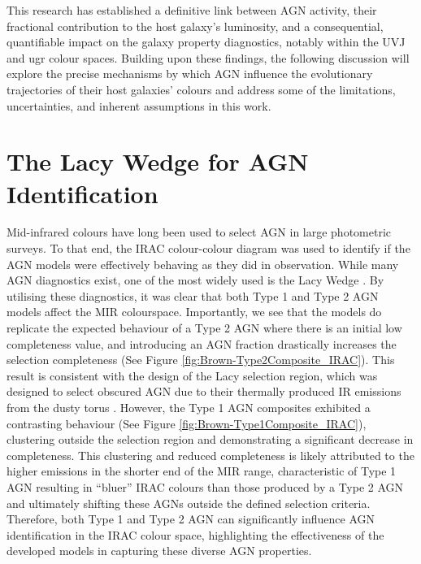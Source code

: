 This research has established a definitive link between AGN activity, their fractional contribution to the host galaxy's luminosity, and a consequential, quantifiable impact on the galaxy property diagnostics, notably within the UVJ and ugr colour spaces. Building upon these findings, the following discussion will explore the precise mechanisms by which AGN influence the evolutionary trajectories of their host galaxies' colours and address some of the limitations, uncertainties, and inherent assumptions in this work.
\section{The Lacy Wedge for AGN Identification}
Mid-infrared colours have long been used to select AGN in large photometric surveys. To that end, the IRAC colour-colour diagram was used to identify if the AGN models were effectively behaving as they did in observation. While many AGN diagnostics exist, one of the most widely used is the Lacy Wedge \citep{lacy_obscured_2004}. By utilising these diagnostics, it was clear that both Type 1 and Type 2 AGN models affect the MIR colourspace. Importantly, we see that the models do replicate the expected behaviour of a Type 2 AGN where there is an initial low completeness value, and introducing an AGN fraction drastically increases the selection completeness (See Figure \ref{fig:Brown-Type2Composite_IRAC}). This result is consistent with the design of the Lacy selection region, which was designed to select obscured AGN due to their thermally produced IR emissions from the dusty torus \citep{lacy_obscured_2004, lacy_optical_2007}. However, the Type 1 AGN composites exhibited a contrasting behaviour (See Figure \ref{fig:Brown-Type1Composite_IRAC}), clustering outside the selection region and demonstrating a significant decrease in completeness. This clustering and reduced completeness is likely attributed to the higher emissions in the shorter end of the MIR range, characteristic of Type 1 AGN \citep{thorne_deep_2022} resulting in ``bluer'' IRAC colours than those produced by a Type 2 AGN and ultimately shifting these AGNs outside the defined selection criteria.  Therefore, both Type 1 and Type 2 AGN can significantly influence AGN identification in the IRAC colour space, highlighting the effectiveness of the developed models in capturing these diverse AGN properties. \\\\
